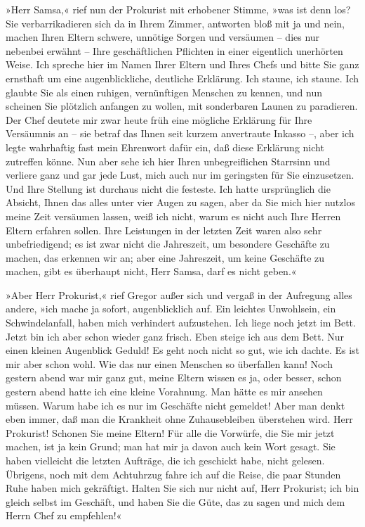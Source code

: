 »Herr Samsa,« rief nun der Prokurist mit erhobener Stimme, »was ist denn
los? Sie verbarrikadieren sich da in Ihrem Zimmer, antworten bloß mit ja
und nein, machen Ihren Eltern schwere, unnötige Sorgen und versäumen --
dies nur nebenbei erwähnt -- Ihre geschäftlichen Pflichten in einer
eigentlich unerhörten Weise. Ich spreche hier im Namen Ihrer Eltern und
Ihres Chefs und bitte Sie ganz ernsthaft um eine augenblickliche,
deutliche Erklärung. Ich staune, ich staune. Ich glaubte Sie als einen
ruhigen, vernünftigen Menschen zu kennen, und nun scheinen Sie plötzlich
anfangen zu wollen, mit sonderbaren Launen zu paradieren. Der Chef
deutete mir zwar heute früh eine mögliche Erklärung für Ihre Versäumnis
an -- sie betraf das Ihnen seit kurzem anvertraute Inkasso --, aber ich
legte wahrhaftig fast mein Ehrenwort dafür ein, daß diese Erklärung
nicht zutreffen könne. Nun aber sehe ich hier Ihren unbegreiflichen
Starrsinn und verliere ganz und gar jede Lust, mich auch nur im
geringsten für Sie einzusetzen. Und Ihre Stellung ist durchaus nicht die
festeste. Ich hatte ursprünglich die Absicht, Ihnen das alles unter vier
Augen zu sagen, aber da Sie mich hier nutzlos meine Zeit versäumen
lassen, weiß ich nicht, warum es nicht auch Ihre Herren Eltern erfahren
sollen. Ihre Leistungen in der letzten Zeit waren also sehr
unbefriedigend; es ist zwar nicht die Jahreszeit, um besondere Geschäfte
zu machen, das erkennen wir an; aber eine Jahreszeit, um keine Geschäfte
zu machen, gibt es überhaupt nicht, Herr Samsa, darf es nicht geben.«

»Aber Herr Prokurist,« rief Gregor außer sich und vergaß in der
Aufregung alles andere, »ich mache ja sofort, augenblicklich auf. Ein
leichtes Unwohlsein, ein Schwindelanfall, haben mich verhindert
aufzustehen. Ich liege noch jetzt im Bett. Jetzt bin ich aber schon
wieder ganz frisch. Eben steige ich aus dem Bett. Nur einen kleinen
Augenblick Geduld! Es geht noch nicht so gut, wie ich dachte. Es ist mir
aber schon wohl. Wie das nur einen Menschen so überfallen kann! Noch
gestern abend war mir ganz gut, meine Eltern wissen es ja, oder besser,
schon gestern abend hatte ich eine kleine Vorahnung. Man hätte es mir
ansehen müssen. Warum habe ich es nur im Geschäfte nicht gemeldet! Aber
man denkt eben immer, daß man die Krankheit ohne Zuhausebleiben
überstehen wird. Herr Prokurist! Schonen Sie meine Eltern! Für alle die
Vorwürfe, die Sie mir jetzt machen, ist ja kein Grund; man hat mir ja
davon auch kein Wort gesagt. Sie haben vielleicht die letzten Aufträge,
die ich geschickt habe, nicht gelesen. Übrigens, noch mit dem Achtuhrzug
fahre ich auf die Reise, die paar Stunden Ruhe haben mich gekräftigt.
Halten Sie sich nur nicht auf, Herr Prokurist; ich bin gleich selbst im
Geschäft, und haben Sie die Güte, das zu sagen und mich dem Herrn Chef
zu empfehlen!«

